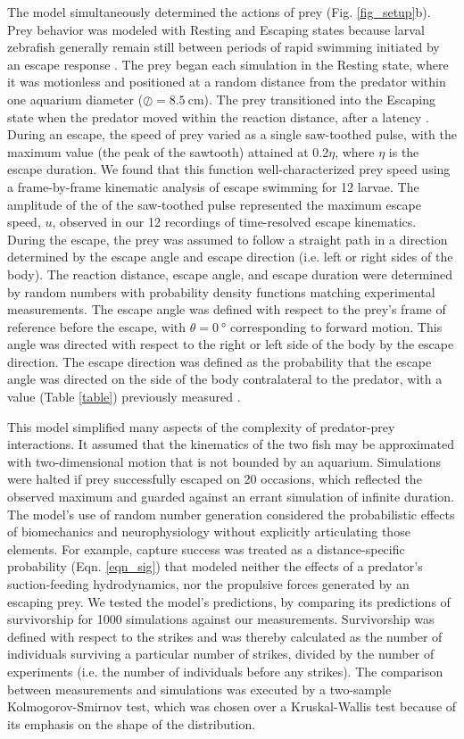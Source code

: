 \documentclass[]{rsos}%
\begin{document}
The model simultaneously determined the actions of prey (Fig. \ref{fig_setup}b).
Prey behavior was modeled with Resting and Escaping states because larval zebrafish generally remain still between periods of rapid swimming initiated by an escape response \cite{Stewart:2013bha, Stewart:2014cma}. 
The prey began each simulation in the Resting state, where it was motionless and positioned at a random distance from the predator within one aquarium diameter ($\oslash = \SI{8.5}{\cm}$).
The prey transitioned into the Escaping state when the predator moved within the reaction distance, after a latency \cite{Nair:2015gk}.
During an escape, the speed of prey varied as a single saw-toothed pulse, with the maximum value (the peak of the sawtooth) attained at 0.2$\eta$, where $\eta$ is the escape duration. 
We found that this function well-characterized prey speed using a frame-by-frame kinematic analysis of escape swimming for 12 larvae. 
The amplitude of the of the saw-toothed pulse represented the maximum escape speed, $u$, observed in our 12 recordings of time-resolved escape kinematics.
During the escape, the prey was assumed to follow a straight path in a direction determined by the escape angle and escape direction (i.e. left or right sides of the body).
The reaction distance, escape angle, and escape duration were determined by random numbers with probability density functions matching experimental measurements.
The escape angle was defined with respect to the prey's frame of reference before the escape, with $\theta =  \SI{0}{\degree}$ corresponding to forward motion.
This angle was directed with respect to the right or left side of the body by the escape direction.
The escape direction was defined as the probability that the escape angle was directed on the side of the body contralateral to the predator, with a value (Table \ref{table}) previously measured \cite{Stewart:2014cma}.

This model simplified many aspects of the complexity of predator-prey interactions.
It assumed that the kinematics of the two fish may be approximated with two-dimensional motion that is not bounded by an aquarium. 
Simulations were halted if prey successfully escaped on 20 occasions, which reflected the observed maximum and guarded against an errant simulation of infinite duration.
The model's use of random number generation considered the probabilistic effects of biomechanics and neurophysiology without explicitly articulating those elements.
For example, capture success was treated as a distance-specific probability (Eqn. \ref{eqn_sig}) that modeled neither the effects of a predator's suction-feeding hydrodynamics, nor the propulsive forces generated by an escaping prey.
We tested the model's predictions, by comparing its predictions of survivorship for 1000 simulations against our measurements.
Survivorship was defined with respect to the strikes and was thereby calculated as the number of individuals surviving a particular number of strikes, divided by the number of experiments (i.e. the number of individuals before any strikes).
The comparison between measurements and simulations was executed by a two-sample Kolmogorov-Smirnov test, which was chosen over a Kruskal-Wallis test because of its emphasis on the shape of the distribution.  
\end{document}
